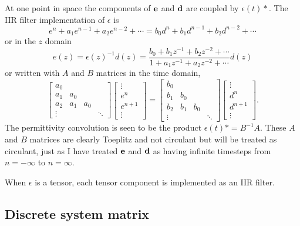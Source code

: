 At one point in space the components of $\textbf{e}$ and $\textbf{d}$ are coupled by $\epsilon(t) \ast$.  The IIR filter implementation of $\epsilon$ is
%
\begin{equation}
e^n + a_1 e^{n-1} + a_2 e^{n-2} + \cdots = b_0 d^n + b_1 d^{n-1} + b_2 d^{n-2} + \cdots
\label{eqn:dispersiveImplementation}
\end{equation}
%
or in the $z$ domain
%
\begin{equation}
e(z) = \epsilon(z)^{-1} d(z) = \frac{b_0 + b_1 z^{-1} + b_2 z^{-2} + \cdots}{1 + a_1 z^{-1} + a_2 z^{-2} + \cdots} d(z)
\end{equation}
%
or written with $A$ and $B$ matrices in the time domain,
%
\begin{equation}
\begin{bmatrix}
a_0 \\
a_1 & a_0 \\
a_2 & a_1 & a_0 \\
\vdots & & & \ddots
\end{bmatrix}
\begin{bmatrix}
\vdots \\ e^{n} \\ e^{n+1} \\ \vdots
\end{bmatrix}
=
\begin{bmatrix}
b_0 \\
b_1 & b_0 \\
b_2 & b_1 & b_0 \\
\vdots & & & \ddots
\end{bmatrix}
\begin{bmatrix}
\vdots \\ d^{n} \\ d^{n+1} \\ \vdots
\end{bmatrix}.
\end{equation}
%
The permittivity convolution is seen to be the product $\epsilon(t) \ast = B^{-1}A$.  These $A$ and $B$ matrices are clearly Toeplitz and not circulant but will be treated as circulant, just as I have treated $\textbf{e}$ and $\textbf{d}$ as having infinite timesteps from $n = - \infty$ to $n = \infty$.

When $\epsilon$ is a tensor, each tensor component is implemented as an IIR filter.

\subsection{Discrete system matrix}

